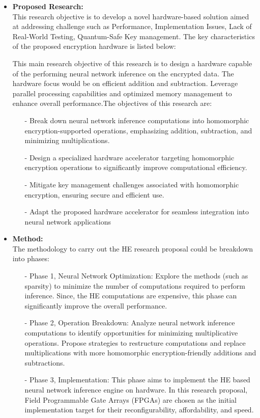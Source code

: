 \begin {itemize}
 \item [$\bullet$] { \bf Proposed Research:} \vspace{0.5em} \\
This research objective is to develop a novel hardware-based solution aimed at addressing  challenge such as Performance, Implementation Issues, Lack of Real-World Testing, Quantum-Safe Key management. The key characteristics of the proposed encryption hardware is listed below:

This main research  objective of this research is to  design a hardware capable of the performing neural network inference on the encrypted data. The hardware focus would be on efficient addition and subtraction. Leverage parallel processing capabilities and optimized memory management to enhance overall performance.The objectives of this research are:
    \begin{itemize}
    \item[-]    Break down neural network inference computations into homomorphic encryption-supported operations, emphasizing addition, subtraction, and minimizing multiplications.
  \item[-]   Design a specialized hardware accelerator targeting homomorphic encryption operations to significantly improve computational efficiency.
  \item[-]   Mitigate key management challenges associated with homomorphic encryption, ensuring secure and efficient use.
  \item[-]   Adapt the proposed hardware accelerator for seamless integration into neural network applications
    \end{itemize}
 \item [$\bullet$] { \bf Method:} \vspace{0.5em} \\
  The methodology to carry out the HE research proposal could be breakdown into phases:
     \begin{itemize}
     \item [-]  Phase 1, Neural Network Optimization: Explore the methods (such as sparsity) to minimize the number of computations required to perform inference. Since, the HE computations are expensive, this phase can significantly improve the overall performance. 
     \item [-]  Phase 2, Operation Breakdown: Analyze neural network inference computations to identify opportunities for minimizing multiplicative operations. Propose strategies to restructure computations and replace multiplications with more homomorphic encryption-friendly additions and subtractions.
     \item [-] Phase 3, Implementation: This phase aims to implement the HE based neural network inference engine on hardware. In this research proposal, Field Programmable Gate Arrays (FPGAs) are chosen as the initial implementation target for their reconfigurability, affordability, and speed.
      

\end{itemize}
\end{itemize}
